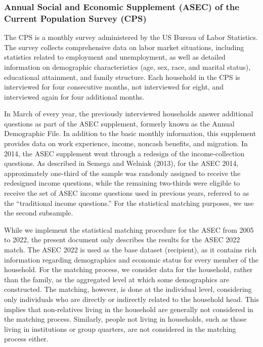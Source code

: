 \documentclass[
  11pt,
]{article}
\begin{document}
\subsubsection{Annual Social and Economic Supplement (ASEC) of the
Current Population Survey
(CPS)}\label{annual-social-and-economic-supplement-asec-of-the-current-population-survey-cps}

The CPS is a monthly survey administered by the US Bureau of Labor
Statistics. The survey collects comprehensive data on labor market
situations, including statistics related to employment and unemployment,
as well as detailed information on demographic characteristics (age,
sex, race, and marital status), educational attainment, and family
structure. Each household in the CPS is interviewed for four consecutive
months, not interviewed for eight, and interviewed again for four
additional months.

In March of every year, the previously interviewed households answer
additional questions as part of the ASEC supplement, formerly known as
the Annual Demographic File. In addition to the basic monthly
information, this supplement provides data on work experience, income,
noncash benefits, and migration. In 2014, the ASEC supplement went
through a redesign of the income-collection questions. As described in
Semega and Welniak (2013), for the ASEC 2014, approximately one-third of
the sample was randomly assigned to receive the redesigned income
questions, while the remaining two-thirds were eligible to receive the
set of ASEC income questions used in previous years, referred to as the
``traditional income questions.'' For the statistical matching purposes,
we use the second subsample.

While we implement the statistical matching procedure for the ASEC from
2005 to 2022, the present document only describes the results for the
ASEC 2022 match. The ASEC 2022 is used as the base dataset (recipient),
as it contains rich information regarding demographics and economic
status for every member of the household. For the matching process, we
consider data for the household, rather than the family, as the
aggregated level at which some demographics are constructed. The
matching, however, is done at the individual level, considering only
individuals who are directly or indirectly related to the household
head. This implies that non-relatives living in the household are
generally not considered in the matching process. Similarly, people not
living in households, such as those living in institutions or group
quarters, are not considered in the matching process either.
\end{document}
